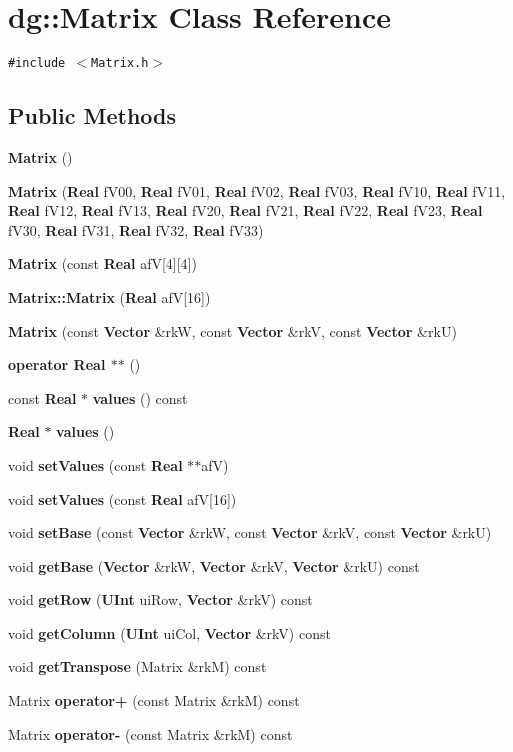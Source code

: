 \section{dg::Matrix Class Reference}
\label{classdg_1_1Matrix}
{\tt \#include $<$Matrix.h$>$}

\subsection*{Public Methods}
\begin{CompactItemize}
\item 
{\bf Matrix} ()
\item 
{\bf Matrix} ({\bf Real} f\-V00, {\bf Real} f\-V01, {\bf Real} f\-V02, {\bf Real} f\-V03, {\bf Real} f\-V10, {\bf Real} f\-V11, {\bf Real} f\-V12, {\bf Real} f\-V13, {\bf Real} f\-V20, {\bf Real} f\-V21, {\bf Real} f\-V22, {\bf Real} f\-V23, {\bf Real} f\-V30, {\bf Real} f\-V31, {\bf Real} f\-V32, {\bf Real} f\-V33)
\item 
{\bf Matrix} (const {\bf Real} af\-V[4][4])
\item 
{\bf Matrix::Matrix} ({\bf Real} af\-V[16])
\item 
{\bf Matrix} (const {\bf Vector} \&rk\-W, const {\bf Vector} \&rk\-V, const {\bf Vector} \&rk\-U)
\item 
{\bf operator Real $\ast$$\ast$} ()
\item 
const {\bf Real} $\ast$ {\bf values} () const
\item 
{\bf Real} $\ast$ {\bf values} ()
\item 
void {\bf set\-Values} (const {\bf Real} $\ast$$\ast$af\-V)
\item 
void {\bf set\-Values} (const {\bf Real} af\-V[16])
\item 
void {\bf set\-Base} (const {\bf Vector} \&rk\-W, const {\bf Vector} \&rk\-V, const {\bf Vector} \&rk\-U)
\item 
void {\bf get\-Base} ({\bf Vector} \&rk\-W, {\bf Vector} \&rk\-V, {\bf Vector} \&rk\-U) const
\item 
void {\bf get\-Row} ({\bf UInt} ui\-Row, {\bf Vector} \&rk\-V) const
\item 
void {\bf get\-Column} ({\bf UInt} ui\-Col, {\bf Vector} \&rk\-V) const
\item 
void {\bf get\-Transpose} (Matrix \&rk\-M) const
\item 
Matrix {\bf operator+} (const Matrix \&rk\-M) const
\item 
Matrix {\bf operator-} (const Matrix \&rk\-M) const
$$
\end{CompactItemize}
